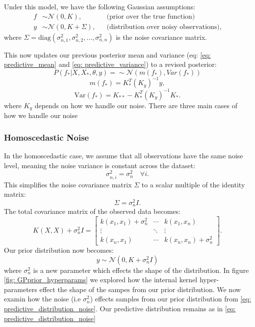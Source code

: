 \documentclass{article}
\begin{document}
\bigskip

\noindent
Under this model, we have the following Gaussian assumptions:
\begin{align}
f &\sim \mathcal{N}(0, K), &&\text{(prior over the true function)} \\
y &\sim \mathcal{N}(0, K + \Sigma), &&\text{(distribution over noisy observations)},
\label{eq: prior_distribution_noise}
\end{align}
where \( \Sigma = \mathrm{diag}(\sigma_{n,1}^2, \sigma_{n,2}^2, \dots, \sigma_{n,n}^2) \) is the noise covariance matrix.

\bigskip
\noindent
This now updates our previous posterior mean and variance (eq: \ref{eq: predictive_mean} and \ref{eq: predictive_variance}) to a revised posterior:
\begin{equation}
    P(f_*|X,X_*,\theta,y) = \sim \mathcal{N}(m(f_*), Var(f_*))
    \label{eq: predictive_distribution_noise}
\end{equation}
\begin{equation}
m(f_*) = K_*^T (K_y)^{-1} y,
\label{eq: predictive_mean_noise}
\end{equation}
\begin{equation}
\text{Var}(f_*) = K_{**} - K_*^T (K_y)^{-1} K_*.
\label{eq: predictive_variance_noise}
\end{equation}
where \(K_y\) depends on how we handle our noise. There are three main cases of how we handle our noise

\subsubsection*{Homoscedastic Noise} 

In the homoscedastic case, we assume that all observations have the same noise level, meaning the noise variance is constant across the dataset:
\[
\sigma_{n,i}^2 = \sigma_n^2 \quad \forall i.
\]
This simplifies the noise covariance matrix \( \Sigma \) to a scalar multiple of the identity matrix:
\[
\Sigma = \sigma_n^2 I.
\]
The total covariance matrix of the observed data becomes:
\[
K(X, X) + \sigma_n^2 I = 
\begin{bmatrix}
k(x_1, x_1) + \sigma_n^2 & \cdots & k(x_1, x_n) \\
\vdots & \ddots & \vdots \\
k(x_n, x_1) & \cdots & k(x_n, x_n) + \sigma_n^2
\end{bmatrix}.
\]
Our prior distribution now becomes:
\begin{equation}
y \sim \mathcal{N}(0, K+\sigma_n^2 I)
\end{equation}
where $\sigma_n^2$ is a new parameter which effects the shape of the distribution. In figure \ref{fig: GPprior_hyperparams} we 
explored how the internal kernel hyper-parameters effect the shape of the sampes from our prior distribution. We now examin how the noise (i.e $\sigma_n^2$) effects samples from our prior distribution from \ref{eq:  predictive_distribution_noise}.
Our predictive distribution remains as in \ref{eq: predictive_distribution_noise}
\end{document}
